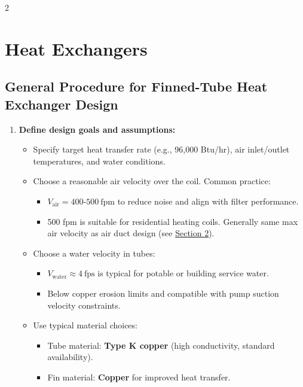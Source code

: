 \begin{multicols*}{2}

    \section{Heat Exchangers}

    \subsection{General Procedure for Finned-Tube Heat Exchanger Design}
    \begin{enumerate}
        \item \textbf{Define design goals and assumptions:}
              \begin{itemize}
                  \item Specify target heat transfer rate (e.g., 96,000 Btu/hr), air inlet/outlet temperatures, and water conditions.
                  \item Choose a reasonable air velocity over the coil. Common practice:
                        \begin{itemize}
                            \item $V_{\text{air}} = 400\text{-}500~\text{fpm}$ to reduce noise and align with filter performance.
                            \item 500 fpm is suitable for residential heating coils. Generally same max air velocity as air duct design (see \underline{Section 2}).
                        \end{itemize}
                  \item Choose a water velocity in tubes:
                        \begin{itemize}
                            \item $V_{\text{water}} \approx 4~\text{fps}$ is typical for potable or building service water.
                            \item Below copper erosion limits and compatible with pump suction velocity constraints.
                        \end{itemize}
                  \item Use typical material choices:
                        \begin{itemize}
                            \item Tube material: \textbf{Type K copper} (high conductivity, standard availability).
                            \item Fin material: \textbf{Copper} for improved heat transfer.

\end{itemize}
\end{itemize}
\end{enumerate}
\end{multicols*}
